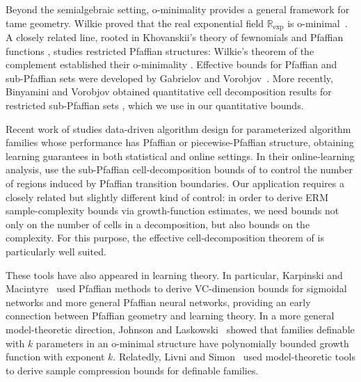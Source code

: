 \documentclass[11pt]{article}
\theoremstyle{plain}
\theoremstyle{definition}
\theoremstyle{remark}
\newcommand{\R}{\mathbb{R}}
\begin{document}
Beyond the semialgebraic setting, o-minimality provides a general framework for
tame geometry. Wilkie proved that the real exponential field \(\R_{\exp}\) is
o-minimal~\citep{Wilkie1996modelcompleteness}. A closely related line, rooted
in Khovanskii's theory of fewnomials and Pfaffian functions
\citep{Khovanskii1991Fewnomials}, studies restricted Pfaffian structures:
Wilkie's theorem of the complement established their o-minimality
\citep{Wilkie1999Complement}. Effective bounds for Pfaffian and sub-Pfaffian
sets were developed by Gabrielov and
Vorobjov~\citep{GabrielovVorobjov2004,GabrielovVorobjov2009}. More recently,
Binyamini and Vorobjov obtained quantitative cell decomposition results for
restricted sub-Pfaffian sets
\citep{binyamini2020effective,binyamini2022sharply}, which we use in our
quantitative bounds.


Recent work of \cite{balcan25} studies data-driven algorithm design for parameterized algorithm families whose performance has Pfaffian or piecewise-Pfaffian structure, obtaining learning guarantees in both statistical and online settings. In their online-learning analysis, \cite{balcan25} use the sub-Pfaffian cell-decomposition bounds of  \cite{GABRIELOV2001179} to control the number of regions induced by Pfaffian transition boundaries. 
Our application requires a closely related but slightly different kind of control: in order to derive ERM sample-complexity bounds via growth-function estimates, we need bounds not only on the number of cells in a decomposition, but also bounds on the complexity. For this purpose, the effective cell-decomposition theorem of \cite{binyamini2020effective} is particularly well suited.


These tools have also appeared in learning theory. In particular, Karpinski and Macintyre~\citep{KarpinskiMacintyre1997} used Pfaffian methods to derive VC-dimension bounds for sigmoidal networks and more general Pfaffian neural networks, providing an early connection between Pfaffian geometry and learning theory. In a more general model-theoretic direction, Johnson and Laskowski~\citep{LaskowskiCompression} showed that families definable with \(k\) parameters in an o-minimal structure have polynomially bounded growth function with exponent \(k\). Relatedly, Livni and Simon~\cite{LivniS13} used model-theoretic tools to derive sample compression bounds for definable families.
\end{document}
